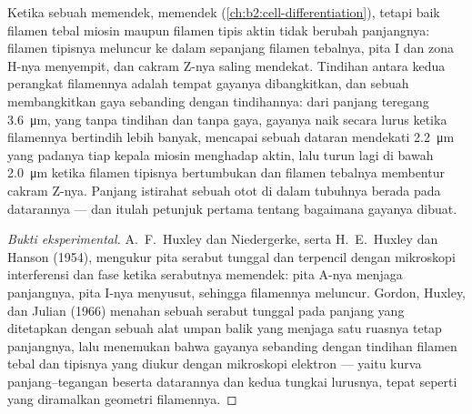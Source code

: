 \begin{proposition}\label{prop:b2:muscle-movement:sliding}
Ketika sebuah  memendek,  memendek
(\cref{ch:b2:cell-differentiation}), tetapi baik filamen tebal miosin
maupun filamen tipis aktin tidak berubah panjangnya: filamen tipisnya
meluncur ke dalam sepanjang filamen tebalnya, pita I dan zona H-nya
menyempit, dan cakram Z-nya saling mendekat. Tindihan antara kedua
perangkat filamennya adalah tempat gayanya dibangkitkan, dan sebuah
 membangkitkan gaya sebanding dengan tindihannya: dari panjang
teregang \qty{3.6}{\micro m}, yang tanpa tindihan dan tanpa gaya,
gayanya naik secara lurus ketika filamennya bertindih lebih banyak,
mencapai sebuah dataran mendekati \qty{2.2}{\micro m} yang padanya tiap
kepala miosin menghadap aktin, lalu turun lagi di bawah
\qty{2.0}{\micro m} ketika filamen tipisnya bertumbukan dan filamen
tebalnya membentur cakram Z-nya. Panjang istirahat sebuah otot di dalam
tubuhnya berada pada datarannya --- dan itulah petunjuk pertama tentang
bagaimana gayanya dibuat.
\end{proposition}
\begin{proof}[Bukti eksperimental]
A.~F.~Huxley dan Niedergerke, serta H.~E.~Huxley dan Hanson (1954),
mengukur pita serabut tunggal dan  terpencil dengan mikroskopi
interferensi dan fase ketika serabutnya memendek: pita A-nya menjaga
panjangnya, pita I-nya menyusut, sehingga filamennya meluncur. Gordon,
Huxley, dan Julian (1966) menahan sebuah serabut tunggal pada panjang
yang ditetapkan dengan sebuah alat umpan balik yang menjaga 
satu ruasnya tetap panjangnya, lalu menemukan bahwa gayanya sebanding
dengan tindihan filamen tebal dan tipisnya yang diukur dengan mikroskopi
elektron --- yaitu kurva panjang--tegangan beserta datarannya dan kedua
tungkai lurusnya, tepat seperti yang diramalkan geometri filamennya.
\end{proof}

